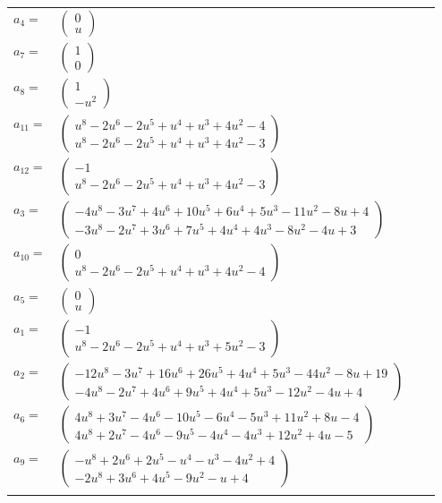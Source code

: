\documentclass[1p]{elsarticle_modified}
\theoremstyle{definition}
\begin{document}
\begin{tabular}{m{7pt} m{180pt} m{7pt} m{180pt} }
\flushright $a_{4}=$&$\begin{pmatrix}0\\u\end{pmatrix}$ \\
\flushright $a_{7}=$&$\begin{pmatrix}1\\0\end{pmatrix}$ \\
\flushright $a_{8}=$&$\begin{pmatrix}1\\- u^2\end{pmatrix}$ \\
\flushright $a_{11}=$&$\begin{pmatrix}u^8-2 u^6-2 u^5+u^4+u^3+4 u^2-4\\u^8-2 u^6-2 u^5+u^4+u^3+4 u^2-3\end{pmatrix}$ \\
\flushright $a_{12}=$&$\begin{pmatrix}-1\\u^8-2 u^6-2 u^5+u^4+u^3+4 u^2-3\end{pmatrix}$ \\
\flushright $a_{3}=$&$\begin{pmatrix}-4 u^8-3 u^7+4 u^6+10 u^5+6 u^4+5 u^3-11 u^2-8 u+4\\-3 u^8-2 u^7+3 u^6+7 u^5+4 u^4+4 u^3-8 u^2-4 u+3\end{pmatrix}$ \\
\flushright $a_{10}=$&$\begin{pmatrix}0\\u^8-2 u^6-2 u^5+u^4+u^3+4 u^2-4\end{pmatrix}$ \\
\flushright $a_{5}=$&$\begin{pmatrix}0\\u\end{pmatrix}$ \\
\flushright $a_{1}=$&$\begin{pmatrix}-1\\u^8-2 u^6-2 u^5+u^4+u^3+5 u^2-3\end{pmatrix}$ \\
\flushright $a_{2}=$&$\begin{pmatrix}-12 u^8-3 u^7+16 u^6+26 u^5+4 u^4+5 u^3-44 u^2-8 u+19\\-4 u^8-2 u^7+4 u^6+9 u^5+4 u^4+5 u^3-12 u^2-4 u+4\end{pmatrix}$ \\
\flushright $a_{6}=$&$\begin{pmatrix}4 u^8+3 u^7-4 u^6-10 u^5-6 u^4-5 u^3+11 u^2+8 u-4\\4 u^8+2 u^7-4 u^6-9 u^5-4 u^4-4 u^3+12 u^2+4 u-5\end{pmatrix}$ \\
\flushright $a_{9}=$&$\begin{pmatrix}- u^8+2 u^6+2 u^5- u^4- u^3-4 u^2+4\\-2 u^8+3 u^6+4 u^5-9 u^2- u+4\end{pmatrix}$\\&\end{tabular}
\end{document}
